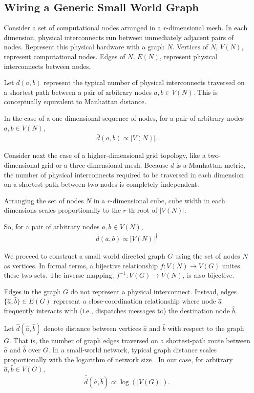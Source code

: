 \subsection{Wiring a Generic Small World Graph}

Consider a set of computational nodes arranged in a $r$-dimensional mesh.
In each dimension, physical interconnects run between immediately adjacent pairs of nodes.
Represent this physical hardware with a graph $N$.
Vertices of $N$, $V(N)$, represent computational nodes.
Edges of $N$, $E(N)$, represent physical interconnects between nodes.

Let $d(a,b)$ represent the typical number of physical interconnects traversed on a shortest path between a pair of arbitrary nodes $a, b \in V(N)$.
This is conceptually equivalent to Manhattan distance.

In the case of a one-dimensional sequence of nodes, for a pair of arbitrary nodes $a,b \in V(N)$,
\begin{align*}
\bar{d}(a,b) \propto |V(N)|.
\end{align*}

Consider next the case of a higher-dimensional grid topology, like a two-dimensional grid or a three-dimensional mesh.
Because $d$ is a Manhattan metric, the number of physical interconnects required to be traversed in each dimension on a shortest-path between two nodes is completely independent.

Arranging the set of nodes $N$ in a $r$-dimensional cube, cube width in each dimensions scales proportionally to the $r$-th root of $|V(N)|$.

So, for a pair of arbitrary nodes $a,b \in V(N)$,
\begin{align} \label{eqn:mesh_prop}
\bar{d}(a, b) \propto |V(N)|^{\frac{1}{r}}
\end{align}

We proceed to construct a small world directed graph $G$ using the set of nodes $N$ as vertices.
In formal terms, a bijective relationship $f: V(N) \rightarrow V(G)$ unites these two sets.
The inverse mapping, $f^{-1}: V(G) \rightarrow V(N)$, is also bijective.

Edges in the graph $G$ do not represent a physical interconnect.
Instead, edges $\{\hat{a}, \hat{b}\} \in E(G)$ represent a close-coordination relationship where node $\hat{a}$ frequently interacts with (i.e., dispatches messages to) the destination node $\hat{b}$.

Let $\hat{d}(\hat{a},\hat{b})$ denote distance between vertices $\hat{a}$ and $\hat{b}$ with respect to the graph $G$.
That is, the number of graph edges traversed on a shortest-path route between $\hat{a}$ and $\hat{b}$ over $G$.
In a small-world network, typical graph distance scales proportionally with the logarithm of network size \citep{watts1998collective}.
In our case, for arbitrary $\hat{a},\hat{b} \in V(G)$,
\begin{align} \label{eqn:smallworld_prop}
\bar{\hat{d}}(\hat{a},\hat{b}) \propto \log(|V(G)|).
\end{align}

